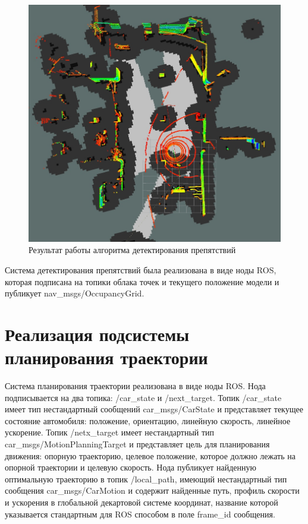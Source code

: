 \begin{figure}[h]
    \centering
    \includegraphics[width=\linewidth]{images/3_devel/obstacles_lidar}
    \caption{Результат работы алгоритма детектирования препятствий}
    \label{img:obstacles_lidar}
\end{figure}

Система детектирования препятствий была реализована в виде ноды ROS, которая подписана на топики облака точек и текущего
положение модели и публикует nav\_msgs/OccupancyGrid.

\section{Реализация подсистемы планирования траектории}

Система планирования траектории реализована в виде ноды ROS.
Нода подписывается на два топика: /car\_state и /next\_target. Топик /car\_state имеет тип нестандартный
сообщений car\_msgs/CarState и представляет текущее состояние автомобиля: положение, ориентацию, линейную скорость,
линейное ускорение. Топик /netx\_target имеет нестандартный тип car\_msgs/MotionPlanningTarget и представляет цель
для планирования движения: опорную траекторию, целевое положение, которое должно лежать на опорной траектории и
целевую скорость. Нода публикует найденную оптимальную траекторию в топик /local\_path, имеющий нестандартный
тип сообщения car\_msgs/CarMotion и содержит найденные путь, профиль скорости и ускорения в глобальной декартовой
системе координат, название которой указывается стандартным для ROS способом в поле frame\_id сообщения.

